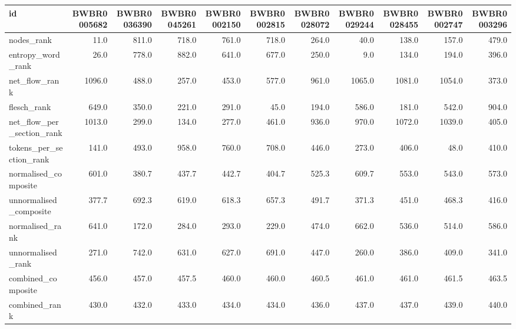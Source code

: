 \begin{tabular}{lrrrrrrrrrr}
\toprule
id & BWBR0005682 & BWBR0036390 & BWBR0045261 & BWBR0002150 & BWBR0002815 & BWBR0028072 & BWBR0029244 & BWBR0028455 & BWBR0002747 & BWBR0003296 \\
\midrule
nodes\_rank & 11.0 & 811.0 & 718.0 & 761.0 & 718.0 & 264.0 & 40.0 & 138.0 & 157.0 & 479.0 \\
\cline{1-11}
entropy\_word\_rank & 26.0 & 778.0 & 882.0 & 641.0 & 677.0 & 250.0 & 9.0 & 134.0 & 194.0 & 396.0 \\
\cline{1-11}
net\_flow\_rank & 1096.0 & 488.0 & 257.0 & 453.0 & 577.0 & 961.0 & 1065.0 & 1081.0 & 1054.0 & 373.0 \\
\cline{1-11}
flesch\_rank & 649.0 & 350.0 & 221.0 & 291.0 & 45.0 & 194.0 & 586.0 & 181.0 & 542.0 & 904.0 \\
\cline{1-11}
net\_flow\_per\_section\_rank & 1013.0 & 299.0 & 134.0 & 277.0 & 461.0 & 936.0 & 970.0 & 1072.0 & 1039.0 & 405.0 \\
\cline{1-11}
tokens\_per\_section\_rank & 141.0 & 493.0 & 958.0 & 760.0 & 708.0 & 446.0 & 273.0 & 406.0 & 48.0 & 410.0 \\
\cline{1-11}
normalised\_composite & 601.0 & 380.7 & 437.7 & 442.7 & 404.7 & 525.3 & 609.7 & 553.0 & 543.0 & 573.0 \\
\cline{1-11}
unnormalised\_composite & 377.7 & 692.3 & 619.0 & 618.3 & 657.3 & 491.7 & 371.3 & 451.0 & 468.3 & 416.0 \\
\cline{1-11}
normalised\_rank & 641.0 & 172.0 & 284.0 & 293.0 & 229.0 & 474.0 & 662.0 & 536.0 & 514.0 & 586.0 \\
\cline{1-11}
unnormalised\_rank & 271.0 & 742.0 & 631.0 & 627.0 & 691.0 & 447.0 & 260.0 & 386.0 & 409.0 & 341.0 \\
\cline{1-11}
combined\_composite & 456.0 & 457.0 & 457.5 & 460.0 & 460.0 & 460.5 & 461.0 & 461.0 & 461.5 & 463.5 \\
\cline{1-11}
combined\_rank & 430.0 & 432.0 & 433.0 & 434.0 & 434.0 & 436.0 & 437.0 & 437.0 & 439.0 & 440.0 \\
\cline{1-11}
\bottomrule
\end{tabular}
